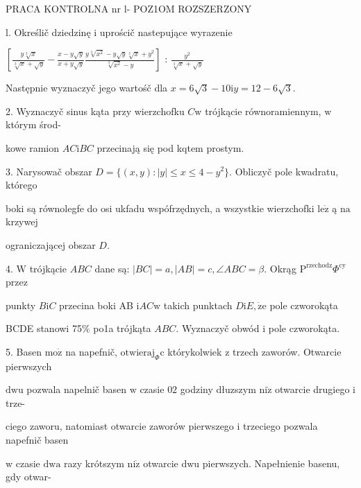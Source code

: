 \documentclass[a4paper,12pt]{article}
\begin{document}
PRACA KONTROLNA nr l- POZ1OM ROZSZERZONY

l. Określič dziedzinę i uprościč nastepujące wyrazenie

$[\displaystyle \frac{y\sqrt[3]{x}}{\sqrt[3]{x}+\sqrt{y}}-\frac{x-y\sqrt{y}}{x+y\sqrt{y}}\frac{y\sqrt[3]{x^{2}}-y\sqrt{y}\sqrt[3]{x}+y^{2}}{\sqrt[3]{x^{2}}-y}]$ : $\displaystyle \frac{y^{2}}{\sqrt[3]{x}+\sqrt{y}}$

Następnie wyznaczyč jego wartośč dla $x=6\sqrt{3}-10 \mathrm{i} y=12-6\sqrt{3}.$

2. Wyznaczyč sinus kąta przy wierzchofku $C\mathrm{w}$ trójkącie równoramiennym, $\mathrm{w}$ którym środ-

kowe ramion $AC\mathrm{i}BC$ przecinają się pod kqtem prostym.

3. Narysowač obszar $D = \{(x,y):|y|\leq x\leq 4-y^{2}\}$. Obliczyč pole kwadratu, którego

boki są równolegfe do osi ukfadu wspófrzędnych, a wszystkie wierzchofki $\mathrm{l}\mathrm{e}\dot{\mathrm{z}}$ ą $\mathrm{n}\mathrm{a}$ krzywej

ograniczającej obszar $D.$

4. $\mathrm{W}$ trójkącie $ABC$ dane są: $|BC|=a, |AB|=c, \angle ABC=\beta$. Okrąg $\mathrm{P}^{\mathrm{r}\mathrm{z}\mathrm{e}\mathrm{c}\mathrm{h}\mathrm{o}\mathrm{d}\mathrm{z}}\Phi^{\mathrm{c}\mathrm{y}}$ przez

punkty $B\mathrm{i}C$ przecina boki AB $\mathrm{i}AC\mathrm{w}$ takich punktach $D\mathrm{i}E, \dot{\mathrm{z}}\mathrm{e}$ pole czworokąta

BCDE stanowi 75\% po1a trójkąta $ABC$. Wyznaczyč obwód $\mathrm{i}$ pole czworokąta.

5. Basen $\mathrm{m}\mathrm{o}\dot{\mathrm{z}}$ na napefnič, $\mathrm{o}\mathrm{t}\mathrm{w}\mathrm{i}\mathrm{e}\mathrm{r}\mathrm{a}\mathrm{j}_{\Phi}\mathrm{c}$ którykolwiek $\mathrm{z}$ trzech zaworów. Otwarcie pierwszych

$\mathrm{d}\mathrm{w}\mathrm{u}$ pozwala napelnič basen $\mathrm{w}$ czasie $02$ godziny dłuzszym $\mathrm{n}\mathrm{i}\dot{\mathrm{z}}$ otwarcie drugiego $\mathrm{i}$ trze-

ciego zaworu, natomiast otwarcie zaworów pierwszego $\mathrm{i}$ trzeciego pozwala napefnič basen

$\mathrm{w}$ czasie $\mathrm{d}\mathrm{w}\mathrm{a}$ razy krótszym $\mathrm{n}\mathrm{i}\dot{\mathrm{z}}$ otwarcie $\mathrm{d}\mathrm{w}\mathrm{u}$ pierwszych. Napełnienie basenu, gdy otwar-
\end{document}
